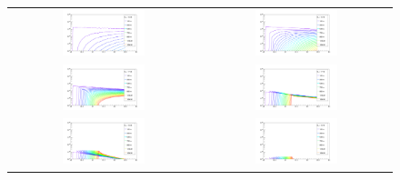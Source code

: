 	
	\begin{figure}[ht!]
		\centering
		\begin{tabular}{cc}
		\includegraphics[width=0.45\textwidth]{fig/resultadosRadio/weights16_25.png} &
		\includegraphics[width=0.45\textwidth]{fig/resultadosRadio/weights16_75.png} \\
		\includegraphics[width=0.45\textwidth]{fig/resultadosRadio/weights17_25.png} &
		\includegraphics[width=0.45\textwidth]{fig/resultadosRadio/weights17_75.png} \\
		\includegraphics[width=0.45\textwidth]{fig/resultadosRadio/weights18_25.png} &
		\includegraphics[width=0.45\textwidth]{fig/resultadosRadio/weights18_75.png} \\
		\end{tabular}


\end{figure}
